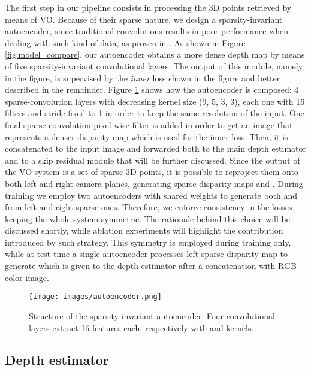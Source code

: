 \documentclass[10pt,twocolumn,letterpaper]{article}
\begin{document}
The first step in our pipeline consists in processing the 3D points retrieved by means of VO. Because of their sparse nature, we design a sparsity-invariant autoencoder, since traditional convolutions results in poor performance when dealing with such kind of data, as proven in \cite{sparse_conv}.
As shown in Figure \ref{fig:model_compare}, our autoencoder obtains a more dense depth map by means of five sparsity-invariant convolutional layers. The output of this module, namely  in the figure, is supervised by the \textit{inner} loss shown in the figure and better described in the remainder. Figure \ref{fig:autoencoder} shows how the autoencoder is composed: 4 sparse-convolution layers with decreasing kernel size (9, 5, 3, 3), each one with 16 filters and stride fixed to 1 in order to keep the same resolution of the input. One final sparse-convolution pixel-wise filter is added in order to get an image that represents a denser disparity map which is used for the inner loss. Then, it is concatenated to the input image and forwarded both to the main depth estimator and to a skip residual module that will be further discussed.
Since the output of the VO system is a set of sparse 3D points, it is possible to reproject them onto both left and right camera planes, generating sparse disparity maps  and . During training we employ two autoencoders with shared weights to generate both  and  from left and right sparse ones. Therefore, we enforce consistency in the losses keeping the whole system symmetric. The rationale behind this choice will be discussed shortly, while ablation experiments will highlight the contribution introduced by such strategy.
This symmetry is employed during training only, while at test time a single autoencoder processes left sparse disparity map  to generate  which is given to the depth estimator after a concatenation with RGB color image.


\begin{figure}
    \centering
    \texttt{[image: images/autoencoder.png]}
    \caption{Structure of the sparsity-invariant autoencoder. Four convolutional layers extract 16 features each, respectively with  and  kernels.
    \label{fig:autoencoder}}
    \vspace{-0.3cm}
\end{figure}

\subsection{Depth estimator}
\end{document}
